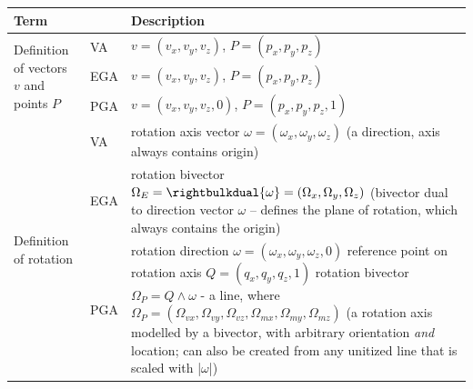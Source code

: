 \newlength{\cwAppPhys}\setlength{\cwAppPhys}{0.15\textwidth}
\newlength{\cwTagPhys}\setlength{\cwTagPhys}{0.06\textwidth}
\newlength{\cwDescPhys}\setlength{\cwDescPhys}{\dimexpr\textwidth - \cwAppPhys -
\cwTagPhys - 4\arrayrulewidth - 6\tabcolsep\relax}
\begin{table}[H]
{\setlength{\extrarowheight}{2pt}\renewcommand{\arraystretch}{1.15}%
\begin{tabular}{|p{\cwAppPhys}|p{\cwTagPhys}|p{\cwDescPhys}|}
    \hline
    \textbf{Term} & & \textbf{Description} \\
    \hline \hline
    \multirow{3}{\cwAppPhys}{Definition of vectors $v$ and points $P$}
    & VA  & $v=(v_x, v_y, v_z)$, $P=(p_x, p_y, p_z)$ \\
    \cline{2-3}
    & EGA & $v=(v_x, v_y, v_z)$, $P=(p_x, p_y, p_z)$ \\
    \cline{2-3}
    & PGA & $v=(v_x, v_y, v_z, 0)$, $P=(p_x, p_y, p_z, 1)$ \\
    \hline \hline
    \multirow{3}{\cwAppPhys}{Definition of rotation}
    & VA  & rotation axis vector $\omega = (\omega_x,\omega_y,\omega_z)$\newline
    (a direction, axis always contains origin)\\
    \cline{2-3}
    & EGA & rotation bivector $\Omega_{E} = \rightbulkdual{\omega} =
    (\Omega_x,\Omega_y,\Omega_z)$\newline
    (bivector dual to direction vector $\omega$ -- defines the plane of rotation, which
    always contains the origin)\\
    \cline{2-3}
    & PGA & rotation direction $\omega = (\omega_x,\omega_y,\omega_z, 0)$ \newline
    reference point on rotation axis $Q = (q_x,q_y,q_z, 1)$
    rotation bivector $\Omega_{P} = Q \wedge \omega $ - a line, where
    \newline
    $\Omega_{P} = (\Omega_{vx},\Omega_{vy},\Omega_{vz},
    \Omega_{mx},\Omega_{my},\Omega_{mz})$
    \newline
    (a rotation axis modelled by a bivector, with arbitrary orientation \emph{and}
    location; can also be created from any unitized line that is scaled with |$\omega$|)\\

\end{tabular}}
\end{table}
